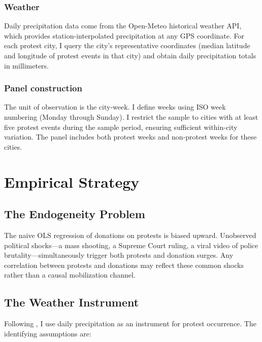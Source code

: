 \documentclass[12pt]{article}
\begin{document}
\subsubsection*{Weather} Daily precipitation data come from the Open-Meteo historical weather API, which provides station-interpolated precipitation at any GPS coordinate. For each protest city, I query the city's representative coordinates (median latitude and longitude of protest events in that city) and obtain daily precipitation totals in millimeters.

\subsubsection*{Panel construction} The unit of observation is the city-week. I define weeks using ISO week numbering (Monday through Sunday). I restrict the sample to cities with at least five protest events during the sample period, ensuring sufficient within-city variation. The panel includes both protest weeks and non-protest weeks for these cities.




\section{Empirical Strategy}
\label{sec:strategy}

\subsection{The Endogeneity Problem}

The naive OLS regression of donations on protests is biased upward. Unobserved political shocks---a mass shooting, a Supreme Court ruling, a viral video of police brutality---simultaneously trigger both protests and donation surges. Any correlation between protests and donations may reflect these common shocks rather than a causal mobilization channel.

\subsection{The Weather Instrument}

Following \citet{madestam2013}, I use daily precipitation as an instrument for protest occurrence. The identifying assumptions are:
\end{document}
